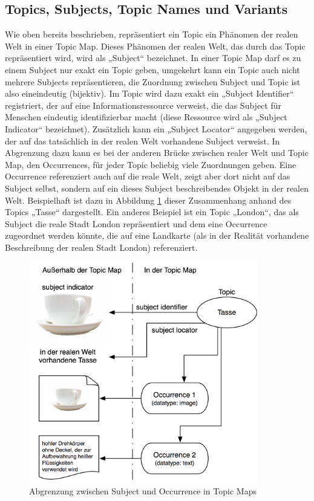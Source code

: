 \subsection{Topics, Subjects, Topic Names und Variants} %
\label{sub:topics_subjects_topic_names_und_variants}

Wie oben bereits beschrieben, repräsentiert ein Topic ein Phänomen der realen Welt in einer Topic Map. Dieses Phänomen der realen Welt, das durch das Topic repräsentiert wird, wird als „Subject“ bezeichnet. In einer Topic Map darf es zu einem Subject nur exakt ein Topic geben, umgekehrt kann ein Topic auch nicht mehrere Subjects repräsentieren, die Zuordnung zwischen Subject und Topic ist also eineindeutig (bijektiv). Im Topic wird dazu exakt ein „Subject Identifier“ registriert, der auf eine Informationsressource verweist, die das Subject für Menschen eindeutig identifizierbar macht (diese Ressource wird als „Subject Indicator“ bezeichnet). Zusätzlich kann ein „Subject Locator“ angegeben werden, der auf das tatsächlich in der realen Welt vorhandene Subject verweist. In Abgrenzung dazu kann es bei der anderen Brücke zwischen realer Welt und Topic Map, den Occurrences, für jeder Topic beliebig viele Zuordnungen geben. Eine Occurrence referenziert auch auf die reale Welt, zeigt aber dort nicht auf das Subject selbst, sondern auf ein dieses Subject beschreibendes Objekt in der realen Welt. Beispielhaft ist dazu in Abbildung \ref{fig:img_Persistenz_SubjectVsOccurrence} dieser Zusammenhang anhand des Topics „Tasse“ dargestellt. Ein anderes Beispiel ist ein Topic „London“, das als Subject die reale Stadt London repräsentiert und dem eine Occurrence zugeordnet werden könnte, die auf eine Landkarte (als in der Realität vorhandene Beschreibung der realen Stadt London) referenziert.

\begin{figure}[htbp]
	\centering
		\includegraphics[width=10cm]{img/Persistenz/SubjectVsOccurrence.png}
	\caption{Abgrenzung zwischen Subject und Occurrence in Topic Maps}
	\label{fig:img_Persistenz_SubjectVsOccurrence}
\end{figure}

